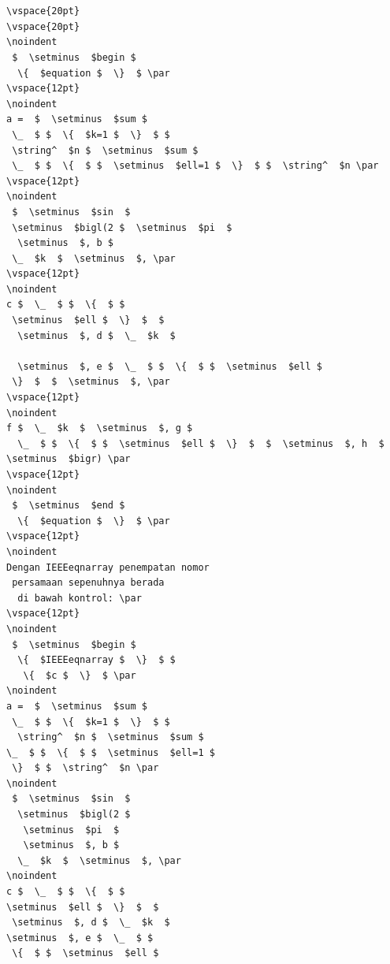   \begin{verbatim}
  
 
\vspace{20pt}
\vspace{20pt}
\noindent 
 $  \setminus  $begin $ 
  \{  $equation $  \}  $ \par
\vspace{12pt}
\noindent 
a =  $  \setminus  $sum $ 
 \_  $ $  \{  $k=1 $  \}  $ $  
 \string^  $n $  \setminus  $sum $  
 \_  $ $  \{  $ $  \setminus  $ell=1 $  \}  $ $  \string^  $n \par
\vspace{12pt}
\noindent 
 $  \setminus  $sin  $  
 \setminus  $bigl(2 $  \setminus  $pi  $ 
  \setminus  $, b $  
 \_  $k  $  \setminus  $, \par
\vspace{12pt}
\noindent 
c $  \_  $ $  \{  $ $ 
 \setminus  $ell $  \}  $  $ 
  \setminus  $, d $  \_  $k  $

  \setminus  $, e $  \_  $ $  \{  $ $  \setminus  $ell $ 
 \}  $  $  \setminus  $, \par
\vspace{12pt}
\noindent 
f $  \_  $k  $  \setminus  $, g $
  \_  $ $  \{  $ $  \setminus  $ell $  \}  $  $  \setminus  $, h  $  \setminus  $bigr) \par
\vspace{12pt}
\noindent 
 $  \setminus  $end $ 
  \{  $equation $  \}  $ \par
\vspace{12pt}
\noindent 
Dengan IEEEeqnarray penempatan nomor
 persamaan sepenuhnya berada
  di bawah kontrol: \par
\vspace{12pt}
\noindent 
 $  \setminus  $begin $ 
  \{  $IEEEeqnarray $  \}  $ $ 
   \{  $c $  \}  $ \par
\noindent 
a =  $  \setminus  $sum $ 
 \_  $ $  \{  $k=1 $  \}  $ $ 
  \string^  $n $  \setminus  $sum $  
\_  $ $  \{  $ $  \setminus  $ell=1 $ 
 \}  $ $  \string^  $n \par
\noindent 
 $  \setminus  $sin  $ 
  \setminus  $bigl(2 $ 
   \setminus  $pi  $  
   \setminus  $, b $ 
  \_  $k  $  \setminus  $, \par
\noindent 
c $  \_  $ $  \{  $ $  
\setminus  $ell $  \}  $  $ 
 \setminus  $, d $  \_  $k  $  
\setminus  $, e $  \_  $ $ 
 \{  $ $  \setminus  $ell $ 



\end{verbatim}
